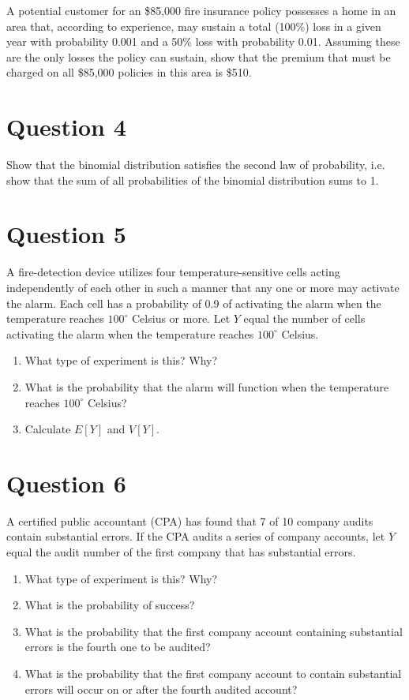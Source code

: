 \documentclass[11pt]{article}
\theoremstyle{definition}
\begin{document}
A potential customer for an \$85,000 fire insurance policy possesses a home in an area that, according to experience, may sustain a total (100\%) loss in a given year with probability 0.001 and a 50\% loss with probability 0.01. Assuming these are the only losses the policy can sustain, show that the premium that must be charged on all \$85,000 policies in this area is \$510.

\section*{Question 4}

Show that the binomial distribution satisfies the second law of probability, i.e. show that the sum of all probabilities of the binomial distribution sums to 1.

\section*{Question 5}

A fire-detection device utilizes four temperature-sensitive cells acting independently of each other in such a manner that any one or more may activate the alarm. Each cell has a probability of 0.9 of activating the alarm when the temperature reaches $100^\circ$ Celsius or more. Let $Y$ equal the number of cells activating the alarm when the temperature reaches $100^\circ$ Celsius.

\begin{enumerate}
	\item What type of experiment is this? Why?
	\item What is the probability that the alarm will function when the temperature reaches $100^\circ$ Celsius?
	\item Calculate $E[Y]$ and $V[Y]$.
\end{enumerate}

\section*{Question 6}

A certified public accountant (CPA) has found that 7 of 10 company audits contain substantial errors. If the CPA audits a series of company accounts, let $Y$ equal the audit number of the first company that has substantial errors.

\begin{enumerate}
	\item What type of experiment is this? Why?
	\item What is the probability of success?
	\item What is the probability that the first company account containing substantial errors is the fourth one to be audited?
	\item What is the probability that the first company account to contain substantial errors will occur on or after the fourth audited account?
\end{enumerate}
\end{document}
